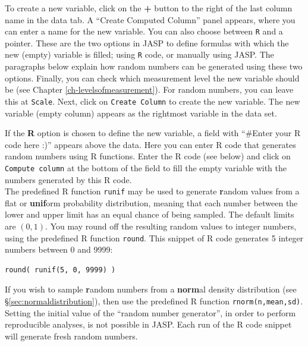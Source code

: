 \documentclass[
]{book}
\begin{document}
To create a new variable, click on the \textbf{+} button to the right of the last column name in the data tab. A ``Create Computed Column'' panel appears, where you can enter a name for the new variable. You can also choose between \texttt{R} and a pointer. These are the two options in JASP to define formulas with which the new (empty) variable is filled; using \texttt{R} code, or manually using JASP. The paragraphs below explain how random numbers can be generated using these two options. Finally, you can check which measurement level the new variable should be (see Chapter \ref{ch-levelsofmeasurement}). For random numbers, you can leave this at \texttt{Scale}. Next, click on \texttt{Create\ Column} to create the new variable. The new variable (empty column) appears as the rightmost variable in the data set.

If the \textbf{R} option is chosen to define the new variable, a field with ``\#Enter your R code here :)'' appears above the data. Here you can enter R code that generates random numbers using R functions. Enter the R code (see below) and click on \texttt{Compute\ column} at the bottom of the field to fill the empty variable with the numbers generated by this R code.\\
The predefined R function \texttt{runif} may be used to generate \textbf{r}andom values from a flat or \textbf{unif}orm probability distribution, meaning that each number between the lower and upper limit has an equal chance of being sampled. The default limits are \((0,1)\). You may round off the resulting random values to integer numbers, using the predefined R function \texttt{round}.
This snippet of R code generates 5 integer numbers between 0 and 9999:

\begin{verbatim}
round( runif(5, 0, 9999) )
\end{verbatim}

If you wish to sample \textbf{r}andom numbers from a \textbf{norm}al density distribution (see §\ref{sec:normaldistribution}), then use the predefined R function \texttt{rnorm(n,mean,sd)}.\\
Setting the initial value of the ``random number generator'', in order to perform reproducible analyses, is not possible in JASP. Each run of the R code snippet will generate fresh random numbers.
\end{document}
